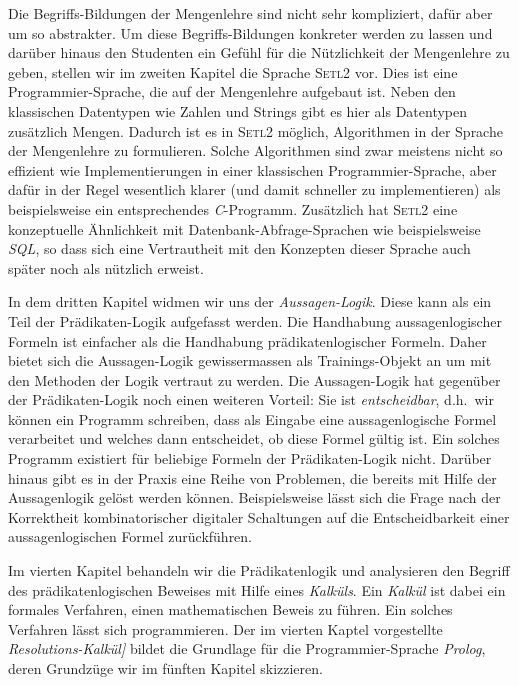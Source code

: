 Die Begriffs-Bildungen der Mengenlehre sind nicht sehr kompliziert, dafür aber um so
abstrakter.  Um diese Begriffs-Bildungen konkreter werden zu lassen und darüber hinaus den
Studenten ein Gefühl für die Nützlichkeit der Mengenlehre zu geben, stellen wir im zweiten
Kapitel die Sprache \textsc{Setl2} vor.  Dies ist eine Programmier-Sprache, die auf der
Mengenlehre aufgebaut ist.  Neben den klassischen Datentypen wie Zahlen und Strings gibt
es hier als Datentypen zusätzlich Mengen.  Dadurch ist es in \textsc{Setl2} möglich,
Algorithmen in der Sprache der Mengenlehre zu formulieren.  Solche Algorithmen sind zwar
meistens nicht so effizient wie Implementierungen in einer klassischen
Programmier-Sprache, aber dafür in der Regel wesentlich klarer (und damit schneller zu
implementieren) als beispielsweise ein entsprechendes \textsl{C}-Programm.  
Zusätzlich hat
\textsc{Setl2} eine konzeptuelle Ähnlichkeit mit Datenbank-Abfrage-Sprachen wie
beispielsweise \textsl{SQL}, so dass sich eine Vertrautheit mit den Konzepten dieser
Sprache auch später noch als nützlich erweist.

In dem dritten Kapitel widmen wir uns der \emph{Aussagen-Logik}.  Diese kann als ein Teil der
Prädikaten-Logik aufgefasst werden. Die Handhabung aussagenlogischer Formeln ist einfacher als die
Handhabung prädikatenlogischer Formeln.  Daher bietet sich die Aussagen-Logik gewissermassen als
Trainings-Objekt an um mit den Methoden der Logik vertraut zu werden.  Die Aussagen-Logik hat
gegenüber der Prädikaten-Logik noch einen weiteren Vorteil: Sie ist \emph{entscheidbar}, d.h.~wir
können ein Programm schreiben, dass als Eingabe eine aussagenlogische Formel verarbeitet und welches
dann entscheidet, ob diese Formel gültig ist.  Ein solches Programm existiert für beliebige Formeln
der Prädikaten-Logik nicht.  Darüber hinaus gibt es in der Praxis eine Reihe von Problemen, die
bereits mit Hilfe der Aussagenlogik gelöst werden können.  Beispielsweise lässt sich die Frage nach der
Korrektheit kombinatorischer digitaler Schaltungen auf die Entscheidbarkeit einer aussagenlogischen
Formel zurückführen.

Im vierten Kapitel behandeln wir die Prädikatenlogik und analysieren den Begriff
des prädikatenlogischen Beweises mit Hilfe eines \emph{Kalküls}.  Ein
\emph{Kalkül} ist dabei ein formales Verfahren, einen mathematischen Beweis zu führen.
Ein solches Verfahren lässt sich programmieren.  Der im vierten Kaptel vorgestellte
\emph{Resolutions-Kalkül]} bildet  die Grundlage für die
Programmier-Sprache \textsl{Prolog}, deren Grundzüge wir im fünften Kapitel
skizzieren.  

